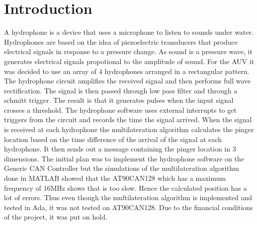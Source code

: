 \section{Introduction}\label{sec:introduction}
A hydrophone is a device that uses a microphone to listen to sounds under water. Hydrophones are based on the idea of piezoelectric transducers that produce electrical signals in response to a pressure change. As sound is a pressure wave, it generates electrical signals propotional to the amplitude of sound.
For the AUV it was decided to use an array of 4 hydrophones arranged in a rectangular pattern. 
The hydrophone circuit amplifies the received signal and then performs full wave rectification. The signal is then passed through low pass filter and through a schmitt trigger. The result is that it generates pulses when the input signal crosses a threshold. \newline
The hydrophone software uses external interrupts to get triggers from the circuit and records the time the signal arrived. When the signal is received at each hydrophone the multilateration algorithm calculates the pinger location based on the time difference of the arrival of the signal at each hydrophone. It then sends out a message containing the pinger location in 3 dimensions.\newline
The initial plan was to implement the hydrophone software on the Generic CAN Controller but the simulations of the multilateration algorithm done in MATLAB showed that the AT90CAN128 which has a maximum frequency of 16MHz shows that is too slow. Hence the calculated position has a lot of errors. Thus even though the multilateration algorithm is implemented and tested in Ada, it was not tested on AT90CAN128. Due to the financial conditions of the project, it was put on hold.
  

